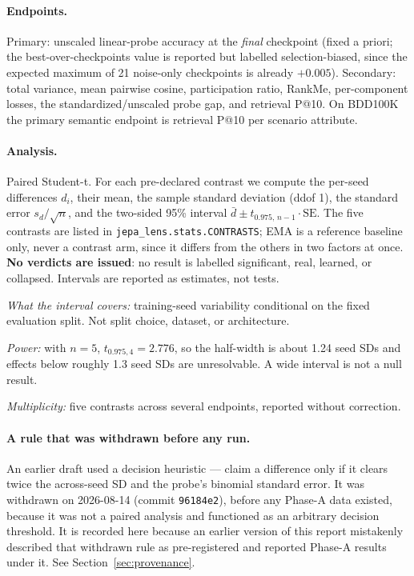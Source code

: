 \paragraph{Endpoints.} Primary: unscaled linear-probe accuracy at the \emph{final}
checkpoint (fixed a priori; the best-over-checkpoints value is reported but labelled
selection-biased, since the expected maximum of 21 noise-only checkpoints is already
$+0.005$). Secondary: total variance, mean pairwise cosine, participation ratio, RankMe,
per-component losses, the standardized/unscaled probe gap, and retrieval P@10. On BDD100K
the primary semantic endpoint is retrieval P@10 per scenario attribute.

\paragraph{Analysis.} Paired Student-t. For each pre-declared contrast we compute the
per-seed differences $d_i$, their mean, the sample standard deviation (ddof 1), the standard
error $s_d/\sqrt{n}$, and the two-sided 95\% interval $\bar{d} \pm t_{0.975,\,n-1}\cdot
\mathrm{SE}$. The five contrasts are listed in \texttt{jepa\_lens.stats.CONTRASTS}; EMA is a
reference baseline only, never a contrast arm, since it differs from the others in two
factors at once. \textbf{No verdicts are issued}: no result is labelled significant, real,
learned, or collapsed. Intervals are reported as estimates, not tests.

\emph{What the interval covers:} training-seed variability conditional on the fixed
evaluation split. Not split choice, dataset, or architecture.

\emph{Power:} with $n=5$, $t_{0.975,4}=2.776$, so the half-width is about 1.24 seed SDs and
effects below roughly 1.3 seed SDs are unresolvable. A wide interval is not a null result.

\emph{Multiplicity:} five contrasts across several endpoints, reported without correction.

\paragraph{A rule that was withdrawn before any run.} An earlier draft used a decision
heuristic --- claim a difference only if it clears twice the across-seed SD and the probe's
binomial standard error. It was withdrawn on 2026-08-14 (commit \texttt{96184e2}), before
any Phase-A data existed, because it was not a paired analysis and functioned as an
arbitrary decision threshold. It is recorded here because an earlier version of this report
mistakenly described that withdrawn rule as pre-registered and reported Phase-A results
under it. See Section~\ref{sec:provenance}.

